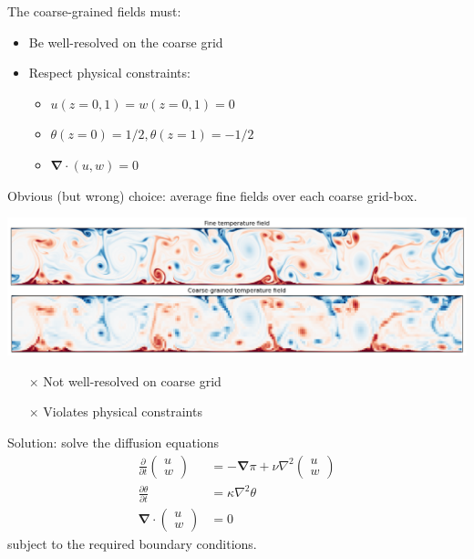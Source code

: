 \documentclass[12pt, aspectratio=169]{beamer}
\newcommand{\pdiff}[2]{\frac{\partial #1}{\partial #2}}
\renewcommand\vec{\bm}
\newcommand{\grad}{\vec{\nabla}}
\begin{document}
\begin{frame}
The coarse-grained fields must:
\vspace{5pt}
\begin{itemize}
    \itemsep=10pt
    \item Be well-resolved on the coarse grid
    \item Respect physical constraints:
    \vspace{5pt}
    \begin{itemize}
        \itemsep=5pt
        \item $u(z=0,1) = w(z=0,1) = 0$
        \item $\theta(z=0) = 1/2, \theta(z=1) = -1/2$
        \item $\grad \cdot (u, w) = 0$
    \end{itemize}
\end{itemize}
\end{frame}

\begin{frame}
Obvious (but wrong) choice: average fine fields over each coarse grid-box.
\begin{center}
    \includegraphics[width=\linewidth]{figures/old_coarse_grain.png}
\end{center}
\begin{itemize}
    \item[$\times$] Not well-resolved on coarse grid
    \item[$\times$] Violates physical constraints
\end{itemize}
\end{frame}

\begin{frame}
Solution: solve the diffusion equations
\begin{align*}
    \pdiff{}{t} \begin{pmatrix} u \\ w \end{pmatrix}
        &= -\grad \pi + \nu \nabla^2 \begin{pmatrix} u \\ w \end{pmatrix} \\[5pt]
    \pdiff{\theta}{t}  &= \kappa \nabla^2 \theta \\[5pt]
    \grad \cdot \begin{pmatrix} u \\ w \end{pmatrix} &= 0
\end{align*}
subject to the required boundary conditions.
\end{frame}
\end{document}
